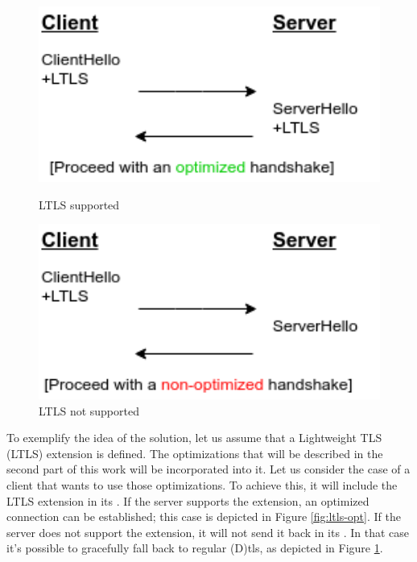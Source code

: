 \documentclass{llncs}
\begin{document}
\begin{figure}
    \centering
    \begin{minipage}{0.5\textwidth}
        \centering
        \includegraphics[width=1.0\textwidth]{img/optimized-handshake.png} %
        \caption{\label{fig:ltls-opt} LTLS supported}
    \end{minipage}\hfill
    \begin{minipage}{0.5\textwidth}
        \centering
        \includegraphics[width=1.0\textwidth]{img/non-optimized-handshake.png} %
        \caption{\label{fig:ltls-non-opt} LTLS not supported}
    \end{minipage}
\end{figure}

To exemplify the idea of the solution, let us assume that a
Lightweight TLS (LTLS) extension is defined. The optimizations that will be described in the second part of this work will be incorporated into it. Let us consider the case of a client that wants to use those
optimizations. To achieve this, it will include the LTLS extension in its
. If the server supports the extension, an
optimized connection can be established; this case is depicted in Figure \ref{fig:ltls-opt}. If the server does not support the extension, it will not
send it back in its . In that case it's possible
to gracefully fall back to regular (D)\gls{tls}, as depicted in Figure \ref{fig:ltls-non-opt}.
\end{document}
